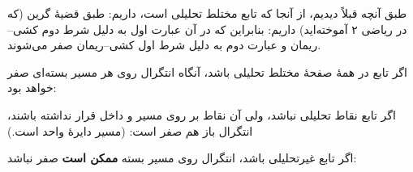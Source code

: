 
\begin{EMproof}

طبق آنچه قبلاً دیدیم، از آنجا که تابع مختلط تحلیلی است، داریم:
طبق قضیهٔ گرین (که در ریاضی ۲ آموخته‌اید) داریم:
بنابراین
که در آن عبارت اول به دلیل شرط دوم کشی--ریمان و عبارت دوم به دلیل شرط اول کشی--ریمان صفر می‌شوند.

\end{EMproof}

\begin{EMexample}{}

اگر تابع در همهٔ صفحهٔ مختلط تحلیلی باشد، آنگاه انتگرال روی هر مسیر بسته‌ای صفر خواهد بود:

\end{EMexample}

\begin{EMexample}{}

اگر تابع نقاط تحلیلی نباشد، ولی آن نقاط بر روی مسیر و داخل  قرار نداشته باشند، انتگرال باز هم صفر است:
(مسیر دایرهٔ واحد است.)

\end{EMexample}

\begin{EMexample}{}

اگر تابع غیرتحلیلی باشد، انتگرال روی مسیر بسته \textbf{ممکن است} صفر نباشد:

\end{EMexample}


